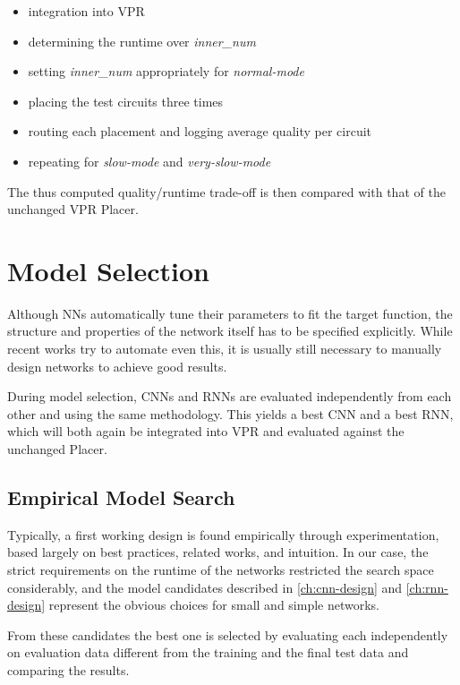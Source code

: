 \begin{itemize}
	\item integration into \gls{VPR}
	\item determining the runtime over \textit{inner\_num}
	\item setting \textit{inner\_num} appropriately for \textit{normal-mode}
	\item placing the test circuits three times
	\item routing each placement and logging average quality per circuit
	\item repeating for \textit{slow-mode} and \textit{very-slow-mode}
\end{itemize}

The thus computed quality/runtime trade-off is then compared with that of the unchanged \gls{VPR} Placer.

\section{Model Selection}\label{ch:model-selection}

Although \glspl{NN} automatically tune their parameters to fit the target function, the structure and properties of the network itself has to be specified explicitly. While recent works try to automate even this, it is usually still necessary to manually design networks to achieve good results.

During model selection, \glspl{CNN} and \glspl{RNN} are evaluated independently from each other and using the same methodology. This yields a best \gls{CNN} and a best \gls{RNN}, which will both again be integrated into \gls{VPR} and evaluated against the unchanged Placer.  

\subsection{Empirical Model Search}

Typically, a first working design is found empirically through experimentation, based largely on best practices, related works, and intuition.\cite{TODO} In our case, the strict requirements on the runtime of the networks restricted the search space considerably, and the model candidates described in \ref{ch:cnn-design} and \ref{ch:rnn-design} represent the obvious choices for small and simple networks.

From these candidates the best one is selected by evaluating each independently on evaluation data different from the training and the final test data and comparing the results.


